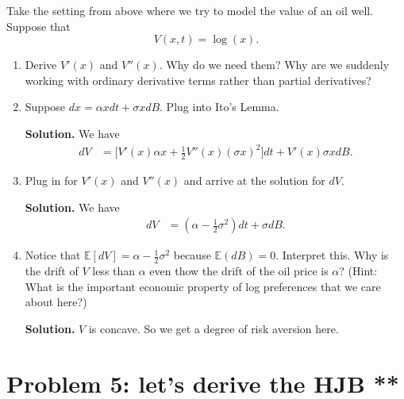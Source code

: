 \documentclass[11pt]{extarticle}
\theoremstyle{plain}
\theoremstyle{definition}
\begin{document}
Take the setting from above where we try to model the value of an oil well. Suppose that 
\begin{equation*}
	V(x, t) = \log(x).
\end{equation*}

\begin{enumerate}
\item Derive $V'(x)$ and $V''(x)$. Why do we need them? Why are we suddenly working with ordinary derivative terms rather than partial derivatives? 

\item Suppose $dx = \alpha x dt + \sigma x dB$. Plug into Ito's Lemma.

\vspace{5mm}
\noindent
\textbf{Solution.} We have
\begin{align*}
	dV &= \bigg[ V'(x) \alpha x + \frac{1}{2} V''(x) (\sigma x)^2 \bigg] dt + V'(x) \sigma x dB.
\end{align*}


\item Plug in for $V'(x)$ and $V''(x)$ and arrive at the solution for $dV$. 

\vspace{5mm}
\noindent
\textbf{Solution.} We have
\begin{align*}
	dV &= (\alpha - \frac{1}{2} \sigma^2 ) dt + \sigma dB.
\end{align*}


\item Notice that $\mathbb E[ dV ] = \alpha - \frac{1}{2} \sigma^2$ because $\mathbb E (dB) = 0$. Interpret this. Why is the drift of $V$ less than $\alpha$ even thow the drift of the oil price is $\alpha$? (Hint: What is the important economic property of log preferences that we care about here?)

\vspace{5mm}
\noindent
\textbf{Solution.} $V$ is concave. So we get a degree of risk aversion here.

\end{enumerate}





\vspace{10mm}
\section*{Problem 5: let's derive the HJB **}
\end{document}

